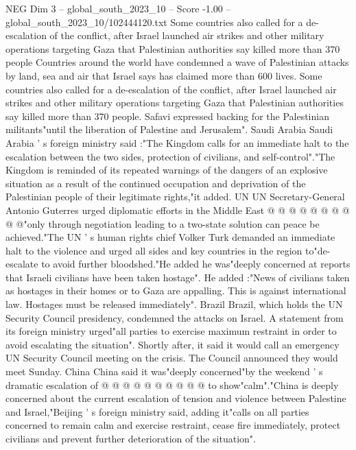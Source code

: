 \begin{textsample}{NEG Dim 3 – global\_south\_2023\_10 – Score -1.00 – global\_south\_2023\_10/102444120.txt}  \label{ex:f3_neg_030}
Some countries also called for a de-escalation of the conflict, after Israel launched air strikes and other military operations targeting Gaza that Palestinian authorities say killed more than 370 people Countries around the world have condemned a wave of Palestinian attacks by land, sea and air that Israel says has claimed more than 600 lives.
Some countries also called for a de-escalation of the conflict, after Israel launched air strikes and other military operations targeting Gaza that Palestinian authorities say killed more than 370 people.
Safavi expressed backing for the Palestinian militants"until the liberation of Palestine and Jerusalem".
Saudi Arabia Saudi Arabia ' s foreign ministry said :"The Kingdom calls for an immediate halt to the escalation between the two sides, protection of civilians, and self-control"."The Kingdom is reminded of its repeated warnings of the dangers of an explosive situation as a result of the continued occupation and deprivation of the Palestinian people of their legitimate rights,"it added.
UN UN Secretary-General Antonio Guterres urged diplomatic efforts in the Middle East @ @ @ @ @ @ @ @ @ @"only through negotiation leading to a two-state solution can peace be achieved."The UN ' s human rights chief Volker Turk demanded an immediate halt to the violence and urged all sides and key countries in the region to"de-escalate to avoid further bloodshed."He added he was"deeply concerned at reports that Israeli civilians have been taken hostage".
He added :"News of civilians taken as hostages in their homes or to Gaza are appalling.
This is against international law.
Hostages must be released immediately".
Brazil Brazil, which holds the UN Security Council presidency, condemned the attacks on Israel.
A statement from its foreign ministry urged"all parties to exercise maximum restraint in order to avoid escalating the situation".
Shortly after, it said it would call an emergency UN Security Council meeting on the crisis.
The Council announced they would meet Sunday.
China China said it was"deeply concerned"by the weekend ' s dramatic escalation of @ @ @ @ @ @ @ @ @ @ to show"calm"."China is deeply concerned about the current escalation of tension and violence between Palestine and Israel,"Beijing ' s foreign ministry said, adding it"calls on all parties concerned to remain calm and exercise restraint, cease fire immediately, protect civilians and prevent further deterioration of the situation".

\end{textsample}
